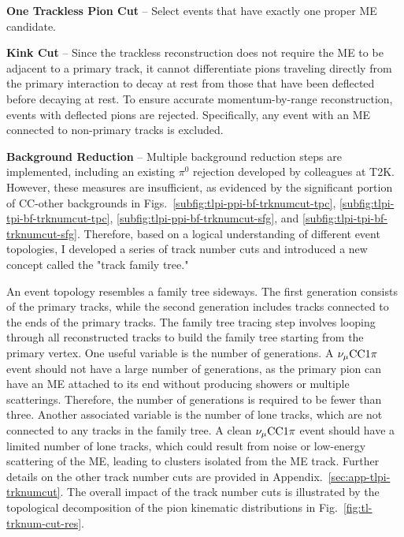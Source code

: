           \textbf{One Trackless Pion Cut} – Select events that have exactly one proper ME candidate.

          \textbf{Kink Cut} – Since the trackless reconstruction does not require the ME to be adjacent to a primary track, it cannot differentiate pions traveling directly from the primary interaction to decay at rest from those that have been deflected before decaying at rest. 
          To ensure accurate momentum-by-range reconstruction, events with deflected pions are rejected. 
          Specifically, any event with an ME connected to non-primary tracks is excluded.

          \textbf{Background Reduction} – Multiple background reduction steps are implemented, including an existing $\pi^0$ rejection developed by colleagues at T2K. 
          However, these measures are insufficient, as evidenced by the significant portion of CC-other backgrounds in Figs.~\ref{subfig:tlpi-ppi-bf-trknumcut-tpc}, \ref{subfig:tlpi-tpi-bf-trknumcut-tpc}, \ref{subfig:tlpi-ppi-bf-trknumcut-sfg}, and \ref{subfig:tlpi-tpi-bf-trknumcut-sfg}. 
          Therefore, based on a logical understanding of different event topologies, I developed a series of track number cuts and introduced a new concept called the "track family tree."

          An event topology resembles a family tree sideways. 
          The first generation consists of the primary tracks, while the second generation includes tracks connected to the ends of the primary tracks. 
          The family tree tracing step involves looping through all reconstructed tracks to build the family tree starting from the primary vertex. 
          One useful variable is the number of generations. 
          A $\nu_{\mu}\textrm{CC}1\pi$ event should not have a large number of generations, as the primary pion can have an ME attached to its end without producing showers or multiple scatterings. 
          Therefore, the number of generations is required to be fewer than three. 
          Another associated variable is the number of lone tracks, which are not connected to any tracks in the family tree. 
          A clean $\nu_{\mu}\textrm{CC}1\pi$ event should have a limited number of lone tracks, which could result from noise or low-energy scattering of the ME, leading to clusters isolated from the ME track. 
          Further details on the other track number cuts are provided in Appendix.~\ref{sec:app-tlpi-trknumcut}. 
          The overall impact of the track number cuts is illustrated by the topological decomposition of the pion kinematic distributions in Fig.~\ref{fig:tl-trknum-cut-res}.

